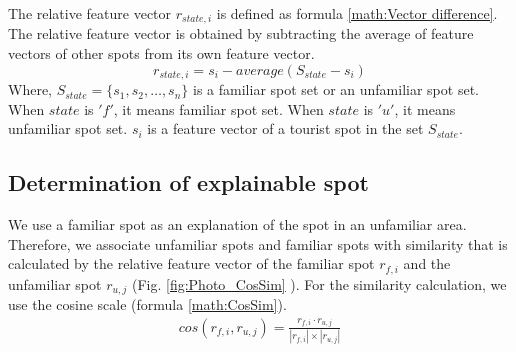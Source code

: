 \documentclass[journal]{IAENGtran}
\begin{document}
The relative feature vector $r_{state,i}$ is defined as formula \ref{math:Vector difference}.
The relative feature vector is obtained by subtracting the average of feature vectors of other spots from its own feature vector.
\begin{equation}
  r_{state,i}=s_i-average(S_{state}-s_i)
  \label{math:Vector difference}
\end{equation}
Where, $S_{state} =\{s_1,s_2,\dots,s_n\}$ is a familiar spot set or an unfamiliar spot set.
When $state$ is $'f'$, it means familiar spot set.
When $state$ is $'u'$, it means unfamiliar spot set.
$s_i$ is a feature vector of a tourist spot in the set $S_{state}$.

\subsection{Determination of explainable spot}
\label{subsec:Determination of explainable spot}
We use a familiar spot as an explanation of the spot in an unfamiliar area.
Therefore, we associate unfamiliar spots and familiar spots with similarity that is calculated by the relative feature vector of the familiar spot $r_{f,i}$ and the unfamiliar spot $r_{u,j}$ (Fig. \ref{fig:Photo_CosSim} ).
For the similarity calculation, we use the cosine scale (formula \ref{math:CosSim}).
\begin{eqnarray}
  cos(r_{f,i},r_{u,j})=\frac{r_{f,i} \cdot r_{u,j}}{|r_{f,i}| \times |r_{u,j}|}
  \label{math:CosSim}
\end{eqnarray}
\end{document}
